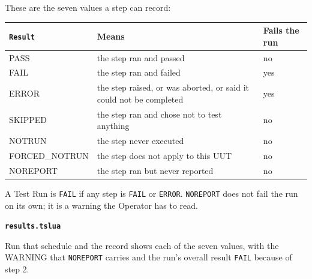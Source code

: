 These are the seven values a step can record:

\begin{center}
\footnotesize
\begin{tabular}{@{}>{\raggedright\arraybackslash}p{3.4cm}>{\raggedright\arraybackslash}p{8.6cm}>{\raggedright\arraybackslash}p{2.2cm}@{}}
\toprule
\texttt{Result} & Means & Fails the run \\
\midrule
PASS & the step ran and passed & no \\
FAIL & the step ran and failed & yes \\
ERROR & the step raised, or was aborted, or said it could not be completed & yes \\
SKIPPED & the step ran and chose not to test anything & no \\
NOTRUN & the step never executed & no \\
FORCED\_NOTRUN & the step does not apply to this UUT & no \\
NOREPORT & the step ran but never reported & no \\
\bottomrule
\end{tabular}
\end{center}

A Test Run is \texttt{FAIL} if any step is \texttt{FAIL} or \texttt{ERROR}. \texttt{NOREPORT}
does not fail the run on its own; it is a warning the Operator has to read.

\noindent\textbf{\texttt{results.tslua}}\par


Run that schedule and the record shows each of the seven values, with the WARNING that
\texttt{NOREPORT} carries and the run's overall result \texttt{FAIL} because of step 2.


